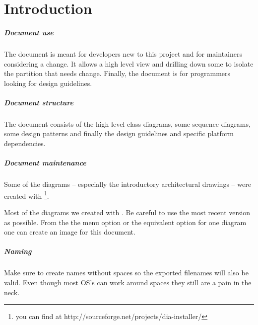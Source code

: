\chapter{Introduction}

\paragraph{Document use} The document is meant for
developers new to this project and for maintainers
considering a change. It allows a high level view 
and drilling down some to isolate the 
partition that needs change. Finally, the document
is for programmers looking for design guidelines.

\paragraph{Document structure} The document consists
of the high level class diagrams, some sequence diagrams,
some design patterns and finally the design guidelines and 
specific platform dependencies.

\paragraph{Document maintenance} Some of the diagrams -- especially 
the introductory architectural drawings -- were created with \footnote{you 
can find  at http://sourceforge.net/projects/dia-installer/}.

Most of the  diagrams we created with . Be careful to use the most 
recent version as possible. From the the menu option  or the equivalent option for one diagram one can create an image for
this document.

\paragraph{Naming} Make sure to create names without spaces so the exported filenames
will also be valid. Even though most OS's can work around spaces they
still are a pain in the neck.


